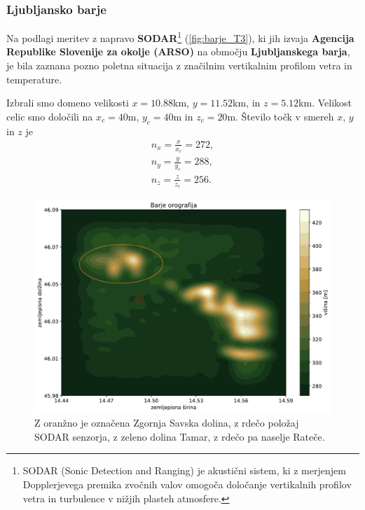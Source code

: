 \documentclass[mat2, tisk]{fmfdelo}
\begin{document}
\newpage
\subsubsection{Ljubljansko barje}

Na podlagi meritev z napravo \textbf{SODAR}\footnote{SODAR (Sonic Detection and Ranging) je akustični sistem, ki z merjenjem Dopplerjevega premika zvočnih valov omogoča določanje vertikalnih profilov vetra in turbulence v nižjih plasteh atmosfere.} 
(\ref{fig:barje_T3}), ki jih izvaja \textbf{Agencija Republike Slovenije za okolje (ARSO)} na območju \textbf{Ljubljanskega barja}, 
je bila  zaznana pozno poletna situacija z značilnim vertikalnim profilom vetra in temperature.

Izbrali smo domeno velikosti $x= 10.88$km, 
$y = 11.52$km, in $z = 5.12$km. Velikost celic smo določili na
$x_c=40$m, $y_c=40$m in $z_c=20$m. Število točk v smereh $x$, $y$ in $z$ je 
\begin{align*}
n_x = \frac{x}{x_c} = 272 , \\
n_y = \frac{y}{y_c} = 288, \\
n_z = \frac{z}{z_c} = 256.
\end{align*}

\begin{figure}[h!]
  \centering
  \includegraphics[width=\textwidth]{rezultati/barje_orografija.pdf}
  \caption{Z oranžno je označena Zgornja Savska dolina, z rdečo položaj SODAR senzorja, 
      z zeleno dolina Tamar, z rdečo pa naselje Rateče.}
  \label{fig:barje_combined}
\end{figure}
\end{document}
